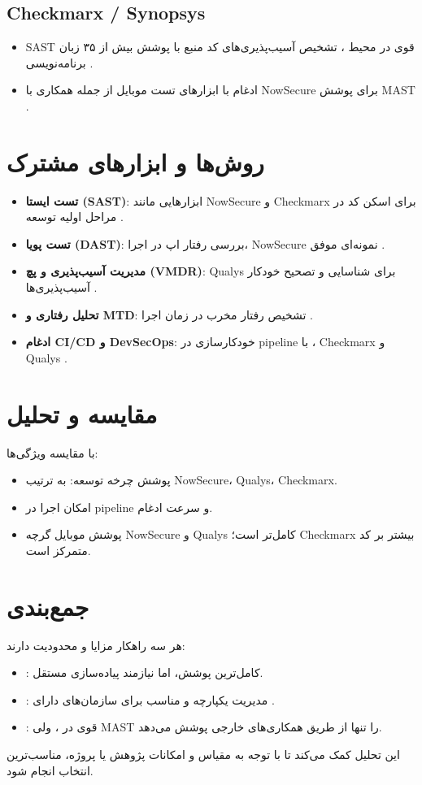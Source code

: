 \subsection{Checkmarx / Synopsys}
\begin{itemize}
  \item SAST قوی در محیط ، تشخیص آسیب‌پذیری‌های کد منبع با پوشش بیش از ۳۵ زبان برنامه‌نویسی \cite{checkmarx2024sast}.
  \item ادغام با ابزارهای تست موبایل از جمله همکاری با NowSecure برای پوشش MAST \cite{checkmarx2024mobile}.
\end{itemize}

\section{روش‌ها و ابزارهای مشترک}
\begin{itemize}
  \item \textbf{تست ایستا (SAST)}: ابزارهایی مانند NowSecure و Checkmarx برای اسکن کد در مراحل اولیه توسعه \cite{nowsecure2024sast}.
  \item \textbf{تست پویا (DAST)}: بررسی رفتار اپ در اجرا، NowSecure نمونه‌ای موفق \cite{nowsecure2024dast}.
  \item \textbf{مدیریت آسیب‌پذیری و پچ (VMDR)}: Qualys برای شناسایی و تصحیح خودکار آسیب‌پذیری‌ها \cite{qualys2024vuln}.
  \item \textbf{تحلیل رفتاری و MTD}: تشخیص رفتار مخرب در زمان اجرا  \cite{nowsecure2024mtd}.
  \item \textbf{ادغام CI/CD و DevSecOps}: خودکارسازی در pipeline با ، Checkmarx و Qualys \cite{checkmarx2024cicd}.
\end{itemize}

\section{مقایسه و تحلیل}
با مقایسه ویژگی‌ها:
\begin{itemize}
  \item پوشش چرخه توسعه: به ترتیب NowSecure، Qualys، Checkmarx.
  \item امکان اجرا در pipeline و سرعت ادغام.
  \item پوشش موبایل گرچه NowSecure و Qualys کامل‌تر است؛ Checkmarx بیشتر بر کد متمرکز است.
\end{itemize}

\section{جمع‌بندی}
هر سه راهکار مزایا و محدودیت دارند:
\begin{itemize}
  \item {}: کامل‌ترین پوشش، اما نیازمند پیاده‌سازی مستقل.
  \item {}: مدیریت یکپارچه و مناسب برای سازمان‌های دارای .
  \item {}: قوی در ، ولی MAST را تنها از طریق همکاری‌های خارجی پوشش می‌دهد.
\end{itemize}
این تحلیل کمک می‌کند تا با توجه به مقیاس و امکانات پژوهش یا پروژه، مناسب‌ترین انتخاب انجام شود. 